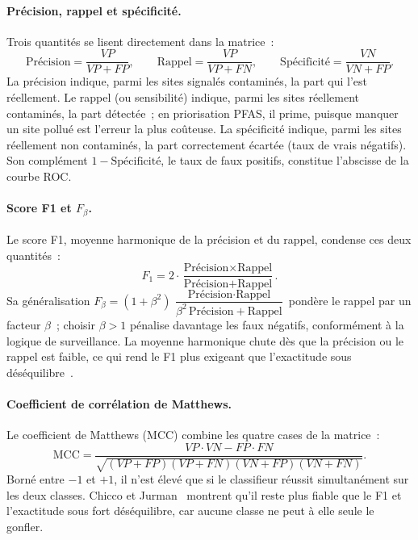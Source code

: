 \paragraph{Pr\'ecision, rappel et sp\'ecificit\'e.}
Trois quantit\'es se lisent directement dans la matrice~:
\begin{equation}
    \text{Pr\'ecision} = \frac{VP}{VP + FP}, \qquad
    \text{Rappel} = \frac{VP}{VP + FN}, \qquad
    \text{Sp\'ecificit\'e} = \frac{VN}{VN + FP}.
    \label{eq:precision-rappel}
\end{equation}
La pr\'ecision indique, parmi les sites signal\'es contamin\'es, la part qui l'est r\'eellement.
Le rappel (ou sensibilit\'e) indique, parmi les sites r\'eellement contamin\'es, la part d\'etect\'ee~; en priorisation PFAS, il prime, puisque manquer un site pollu\'e est l'erreur la plus co\^uteuse.
La sp\'ecificit\'e indique, parmi les sites r\'eellement non contamin\'es, la part correctement \'ecart\'ee (taux de vrais n\'egatifs).
Son compl\'ement $1 - \text{Sp\'ecificit\'e}$, le taux de faux positifs, constitue l'abscisse de la courbe ROC.

\paragraph{Score F1 et $F_\beta$.}
Le score F1, moyenne harmonique de la pr\'ecision et du rappel, condense ces deux quantit\'es~:
\begin{equation}
    F_1 = 2 \cdot \frac{\text{Pr\'ecision} \times \text{Rappel}}{\text{Pr\'ecision} + \text{Rappel}}.
    \label{eq:f1}
\end{equation}
Sa g\'en\'eralisation $F_\beta = (1+\beta^2)\,\dfrac{\text{Pr\'ecision} \cdot \text{Rappel}}{\beta^2\,\text{Pr\'ecision} + \text{Rappel}}$ pond\`ere le rappel par un facteur $\beta$~; choisir $\beta > 1$ p\'enalise davantage les faux n\'egatifs, conform\'ement \`a la logique de surveillance.
La moyenne harmonique chute d\`es que la pr\'ecision ou le rappel est faible, ce qui rend le F1 plus exigeant que l'exactitude sous d\'es\'equilibre~\cite{sokolova2009metrics}.

\paragraph{Coefficient de corr\'elation de Matthews.}
Le coefficient de Matthews (MCC) combine les quatre cases de la matrice~:
\begin{equation}
    \mathrm{MCC} = \frac{VP \cdot VN - FP \cdot FN}{\sqrt{(VP+FP)(VP+FN)(VN+FP)(VN+FN)}}.
    \label{eq:mcc}
\end{equation}
Born\'e entre $-1$ et $+1$, il n'est \'elev\'e que si le classifieur r\'eussit simultan\'ement sur les deux classes.
Chicco et Jurman~\cite{chicco2020mcc} montrent qu'il reste plus fiable que le F1 et l'exactitude sous fort d\'es\'equilibre, car aucune classe ne peut \`a elle seule le gonfler.

